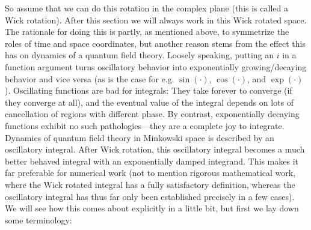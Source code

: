 \documentclass[9pt,twocolumn,twoside]{article}
\begin{document}
So assume that we can do this rotation in the complex plane (this is called a Wick rotation).  After this section we will always work in this Wick rotated space.  The rationale for doing this is partly, as mentioned above, to symmetrize the roles of time and space coordinates, but another reason stems from the effect this has on dynamics of a quantum field theory.  Loosely speaking, putting an $i$ in a function argument turns oscillatory behavior into exponentially growing/decaying behavior and vice versa (as is the case for e.g. $\sin(\cdot)$, $\cos(\cdot)$, and $\exp(\cdot)$).  Oscillating functions are bad for integrals: They take forever to converge (if they converge at all), and the eventual value of the integral depends on lots of cancellation of regions with different phase.  By contrast, exponentially decaying functions exhibit no such pathologies---they are a complete joy to integrate.  Dynamics of quantum field theory in Minkowski space is described by an oscillatory integral.  After Wick rotation, this oscillatory integral becomes a much better behaved integral with an exponentially damped integrand.  This makes it far preferable for numerical work (not to mention rigorous mathematical work, where the Wick rotated integral has a fully satisfactory definition, whereas the oscillatory integral has thus far only been established precisely in a few cases).  We will see how this comes about explicitly in a little bit, but first we lay down some terminology:

\end{document}
